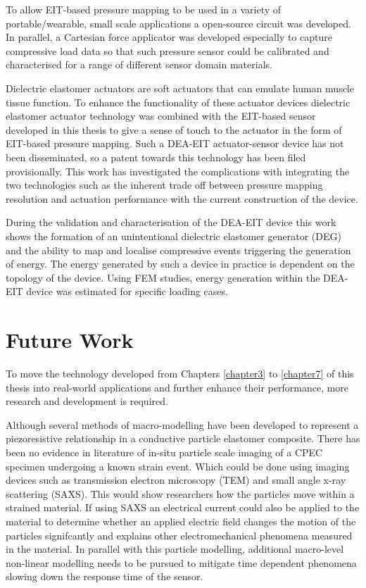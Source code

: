 To allow EIT-based pressure mapping to be used in a variety of portable/wearable, small scale applications a open-source circuit was developed. In parallel, a Cartesian force applicator was developed especially to capture compressive load data so that such pressure sensor could be calibrated and characterised for a range of different sensor domain materials.

Dielectric elastomer actuators are soft actuators that can emulate human muscle tissue function. To enhance the functionality of these actuator devices dielectric elastomer actuator technology was combined with the EIT-based sensor developed in this thesis to give a sense of touch to the actuator in the form of EIT-based pressure mapping. Such a DEA-EIT actuator-sensor device has not been disseminated, so a patent towards this technology has been filed provisionally. This work has investigated the complications with integrating the two technologies such as the inherent trade off between pressure mapping resolution and actuation performance with the current construction of the device.

During the validation and characterisation of the DEA-EIT device this work shows the formation of an unintentional dielectric elastomer generator (DEG) and the ability to map and localise compressive events triggering the generation of energy. The energy generated by such a device in practice is dependent on the topology of the device. Using FEM studies, energy generation within the DEA-EIT device was estimated for specific loading cases.



\section{Future Work}
To move the technology developed from Chapters \ref{chapter3} to \ref{chapter7} of this thesis into real-world applications and further enhance their performance, more research and development is required.

Although several methods of macro-modelling have been developed to represent a piezoresistive relationship in a conductive particle elastomer composite. There has been no evidence in literature of in-situ particle scale imaging of a CPEC specimen undergoing a known strain event. Which could be done using imaging devices such as transmission electron microscopy (TEM) and small angle x-ray scattering (SAXS). This would show researchers how the particles move within a strained material. If using SAXS an electrical current could also be applied to the material to determine whether an applied electric field changes the motion of the particles signifcantly and explains other electromechanical phenomena measured in the material. In parallel with this particle modelling, additional macro-level non-linear modelling needs to be pursued to mitigate time dependent phenomena slowing down the response time of the sensor.

